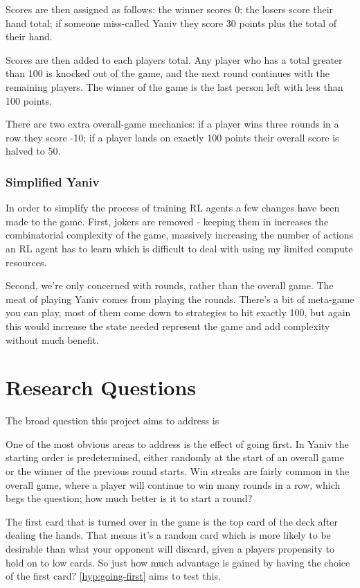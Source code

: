\documentclass[../main.tex]{subfiles}
\begin{document}
Scores are then assigned as follows: the winner scores 0; the losers score their hand total; if someone miss-called Yaniv they score 30 points plus the total of their hand. 

Scores are then added to each players total. Any player who has a total greater than 100 is knocked out of the game, and the next round continues with the remaining players. The winner of the game is the last person left with less than 100 points.

There are two extra overall-game mechanics: if a player wins three rounds in a row they score -10; if a player lands on exactly 100 points their overall score is halved to 50.

\subsubsection{Simplified Yaniv}

In order to simplify the process of training RL agents a few changes have been made to the game. First, jokers are removed - keeping them in increases the combinatorial complexity of the game, massively increasing the number of actions an RL agent has to learn which is difficult to deal with using my limited compute resources. 

Second, we're only concerned with rounds, rather than the overall game. The meat of playing Yaniv comes from playing the rounds. There's a bit of meta-game you can play, most of them come down to strategies to hit exactly 100, but again this would increase the state needed represent the game and add complexity without much benefit. 

\section{Research Questions} \label{intro:reserach-qs}
The broad question this project aims to address is 

One of the most obvious areas to address is the effect of going first. In Yaniv the starting order is predetermined, either randomly at the start of an overall game or the winner of the previous round starts. Win streaks are fairly common in the overall game, where a player will continue to win many rounds in a row, which begs the question; how much better is it to start a round? 

The first card that is turned over in the game is the top card of the deck after dealing the hands. That means it's a random card which is more likely to be desirable than what your opponent will discard, given a players propensity to hold on to low cards. So just how much advantage is gained by having the choice of the first card? \cref{hyp:going-first} aims to test this.
\end{document}
